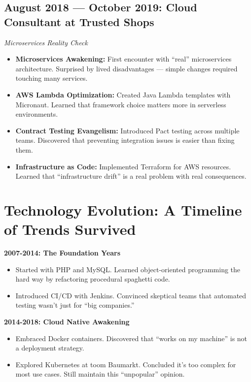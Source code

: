 \documentclass[11pt,a4paper]{article}
\begin{document}
\subsection*{August 2018 --- October 2019: Cloud Consultant at Trusted Shops}
\textit{Microservices Reality Check}

\begin{itemize}[nosep,leftmargin=1.5em]
    \item \textbf{Microservices Awakening:} First encounter with ``real'' microservices architecture. Surprised by lived disadvantages --- simple changes required touching many services.
    \item \textbf{AWS Lambda Optimization:} Created Java Lambda templates with Micronaut. Learned that framework choice matters more in serverless environments.
    \item \textbf{Contract Testing Evangelism:} Introduced Pact testing across multiple teams. Discovered that preventing integration issues is easier than fixing them.
    \item \textbf{Infrastructure as Code:} Implemented Terraform for AWS resources. Learned that ``infrastructure drift'' is a real problem with real consequences.
\end{itemize}

\vspace{0.5em}

\section*{Technology Evolution: A Timeline of Trends Survived}

\textbf{2007-2014: The Foundation Years}
\begin{itemize}[nosep,leftmargin=1.5em]
    \item Started with PHP and MySQL. Learned object-oriented programming the hard way by refactoring procedural spaghetti code.
    \item Introduced CI/CD with Jenkins. Convinced skeptical teams that automated testing wasn't just for ``big companies.''
\end{itemize}

\textbf{2014-2018: Cloud Native Awakening}
\begin{itemize}[nosep,leftmargin=1.5em]
    \item Embraced Docker containers. Discovered that ``works on my machine'' is not a deployment strategy.
    \item Explored Kubernetes at toom Baumarkt. Concluded it's too complex for most use cases. Still maintain this ``unpopular'' opinion.
\end{itemize}
\end{document}
